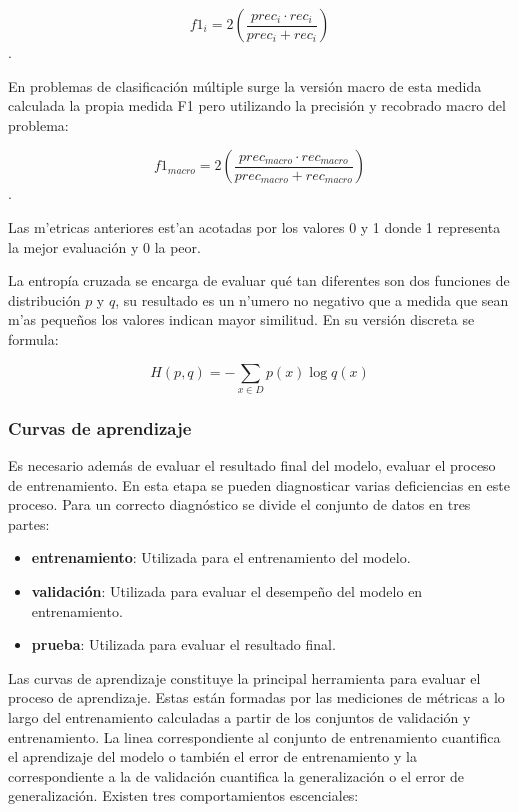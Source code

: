 \begin{equation}
	f1_i = 2 (\frac{prec_i · rec_i}{prec_i + rec_i})
\end{equation}.

En problemas de clasificación múltiple surge la versión macro de esta medida calculada la propia medida F1 pero
utilizando la precisión y recobrado macro del problema:

\begin{equation}
	f1_{macro} = 2 (\frac{prec_{macro} · rec_{macro}}{prec_{macro} + rec_{macro}})
\end{equation}.

Las m'etricas anteriores est'an acotadas por los valores 0 y 1 donde 1 representa la mejor evaluación y 0 la 
peor.

La entropía cruzada se encarga de evaluar qué tan diferentes son dos funciones de distribución $p$ y $q$, su 
resultado es un n'umero no negativo que a medida que sean m'as pequeños los valores indican mayor similitud. 
En su versión discreta se formula:

\begin{equation}
	H(p, q) = - \sum_{x \in D} p(x) \log q(x)
\end{equation}

\subsubsection{Curvas de aprendizaje}

Es necesario además de evaluar el resultado final del modelo, evaluar el proceso de entrenamiento. En esta etapa 
se pueden diagnosticar varias deficiencias en este proceso. Para un correcto diagnóstico se divide el conjunto de 
datos en tres partes:

\begin{itemize}
	\item \textbf{entrenamiento}: Utilizada para el entrenamiento del modelo.
	\item \textbf{validación}: Utilizada para evaluar el desempeño del modelo en entrenamiento.
	\item \textbf{prueba}: Utilizada para evaluar el resultado final.
\end{itemize}

Las curvas de aprendizaje constituye la principal herramienta para evaluar el proceso de aprendizaje.
Estas están formadas por las mediciones de métricas a lo largo del entrenamiento calculadas a partir de 
los conjuntos de validación y entrenamiento. La linea correspondiente al conjunto de entrenamiento cuantifica 
el aprendizaje del modelo o también el error de entrenamiento y la correspondiente a la de validación cuantifica 
la generalización o el error de generalización. Existen tres comportamientos escenciales:

